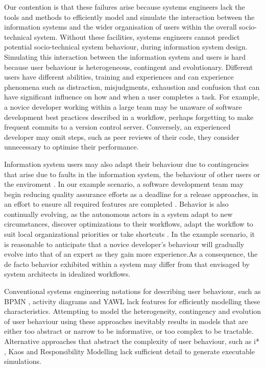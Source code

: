 \documentclass{llncs}
\begin{document}
Our contention is that these failures arise because systems engineers lack the tools and methods to efficiently model
and simulate the interaction between the information systems and the wider organisation of users within the overall
socio-technical system.  Without these facilities, systems engineers cannot predict potential socio-technical system
behaviour, during information system design. Simulating this interaction between the information system and users is
hard because user behaviour is heterogeneous, contingent and evolutionary.  Different users have different abilities,
training and experiences and can experience phenomena such as distraction, misjudgments, exhaustion and confusion that
can have significant influence on how and when a user completes a task.  For example, a novice developer working within
a large team may be unaware of software development best practices described in a workflow, perhaps forgetting to make
frequent commits to a version control server.  Conversely, an experienced developer may omit steps, such as peer reviews
of their code, they consider unnecessary to optimise their performance.

Information system users may also adapt their behaviour due to contingencies that arise due to faults in the information
system, the behaviour of other users or the enviroment \citep{sommerville09deriving}.  In our example scenario, a
software development team may begin reducing quality assurance efforts as a deadline for a release approaches, in an
effort to ensure all required features are completed \citep{beck02test}. Behavior is also continually evolving, as the
autonomous actors in a system adapt to new circumstances, discover optimizations to their workflows, adapt the workflow
to suit local organizational priorities or take shortcuts
\citep{anderson04heterogeneous,bonen79evolutionary,lyytinen2008explaining}.  In the example scenario, it is reasonable
to anticipate that a novice developer's behaviour will gradually evolve into that of an expert as they gain more
experience.As a consequence, the de facto behavior exhibited within a system may differ from that envisaged by system
architects in idealized workflows.

Conventional systems engineering notations for describing user behaviour, such as BPMN \citep{omg2011omgbpmn}, activity
diagrams \citep{omg07omguml} and YAWL \citep{hofstede2010yawl} lack features for efficiently modelling these
characteristics.  Attempting to model the heterogeneity, contingency and evolution of user behaviour using these
approaches inevitably results in models that are either too abstract or narrow to be informative, or too complex to be
tractable.  Alternative approaches that abstract the complexity of user behaviour, such as i* \citep{yu1995social},
Kaos \citep{werneck2009goreistarkaos} and Responsibility Modelling \citep{sommerville09deriving} lack sufficient detail to
generate executable simulations.
\end{document}
